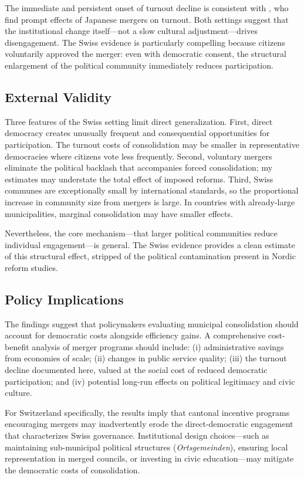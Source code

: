 \documentclass[12pt]{article}
\begin{document}
The immediate and persistent onset of turnout decline is consistent with \citet{horiuchi2015municipal}, who find prompt effects of Japanese mergers on turnout. Both settings suggest that the institutional change itself---not a slow cultural adjustment---drives disengagement. The Swiss evidence is particularly compelling because citizens voluntarily approved the merger: even with democratic consent, the structural enlargement of the political community immediately reduces participation.

\subsection{External Validity}

Three features of the Swiss setting limit direct generalization. First, direct democracy creates unusually frequent and consequential opportunities for participation. The turnout costs of consolidation may be smaller in representative democracies where citizens vote less frequently. Second, voluntary mergers eliminate the political backlash that accompanies forced consolidation; my estimates may understate the total effect of imposed reforms. Third, Swiss communes are exceptionally small by international standards, so the proportional increase in community size from mergers is large. In countries with already-large municipalities, marginal consolidation may have smaller effects.

Nevertheless, the core mechanism---that larger political communities reduce individual engagement---is general. The Swiss evidence provides a clean estimate of this structural effect, stripped of the political contamination present in Nordic reform studies.

\subsection{Policy Implications}

The findings suggest that policymakers evaluating municipal consolidation should account for democratic costs alongside efficiency gains. A comprehensive cost-benefit analysis of merger programs should include: (i) administrative savings from economies of scale; (ii) changes in public service quality; (iii) the turnout decline documented here, valued at the social cost of reduced democratic participation; and (iv) potential long-run effects on political legitimacy and civic culture.

For Switzerland specifically, the results imply that cantonal incentive programs encouraging mergers may inadvertently erode the direct-democratic engagement that characterizes Swiss governance. Institutional design choices---such as maintaining sub-municipal political structures (\textit{Ortsgemeinden}), ensuring local representation in merged councils, or investing in civic education---may mitigate the democratic costs of consolidation.
\end{document}
